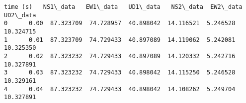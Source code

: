 \documentclass[11pt]{article}
\makeatletter
\newcommand{\boxspacing}{\kern\kvtcb@left@rule\kern\kvtcb@boxsep}
\newcommand{\prompt}[4]{
        \ttfamily\llap{{\color{#2}[#3]:\hspace{3pt}#4}}\vspace{-\baselineskip}
    }
\makeatother
\begin{document}
            \begin{tcolorbox}[breakable, size=fbox, boxrule=.5pt, pad at break*=1mm, opacityfill=0]
\prompt{Out}{outcolor}{57}{\boxspacing}
\begin{Verbatim}[commandchars=\\\{\}]
   time (s)   NS1\_data   EW1\_data   UD1\_data   NS2\_data  EW2\_data   UD2\_data
0      0.00  87.323709  74.728957  40.898042  14.116521  5.246528  10.324715
1      0.01  87.323709  74.729433  40.897089  14.119062  5.242081  10.325350
2      0.02  87.323232  74.729433  40.897089  14.120332  5.242716  10.327891
3      0.03  87.323232  74.729433  40.898042  14.115250  5.246528  10.329161
4      0.04  87.323232  74.729433  40.898042  14.108262  5.249704  10.327891
\end{Verbatim}
\end{tcolorbox}
        
\end{document}
